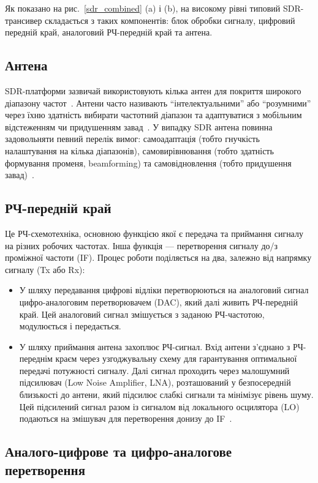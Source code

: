 \documentclass[journal]{IEEEtran}
\begin{document}
\label{arch}
Як показано на рис.~\ref{sdr_combined} (a) і (b), на високому рівні типовий SDR-трансивер складається з таких компонентів: блок обробки сигналу, цифровий передній край, аналоговий РЧ-передній край та антена.

\subsection{Антена}
SDR-платформи зазвичай використовують кілька антен для покриття широкого діапазону частот~\cite{rohde2017}.
Антени часто називають ``інтелектуальними'' або ``розумними'' через їхню здатність вибирати частотний діапазон та адаптуватися з мобільним відстеженням чи придушенням завад~\cite{Rouphael2009,Haghighat2002a}.
У випадку SDR антена повинна задовольняти певний перелік вимог: самоадаптація (тобто гнучкість налаштування на кілька діапазонів), самовирівнювання (тобто здатність формування променя, beamforming) та самовідновлення (тобто придушення завад)~\cite{Rouphael2009}.

\subsection{РЧ-передній край}
Це РЧ-схемотехніка, основною функцією якої є передача та приймання сигналу на різних робочих частотах.
Інша функція — перетворення сигналу до/з проміжної частоти (IF).
Процес роботи поділяється на два, залежно від напрямку сигналу (Tx або Rx):
\begin{itemize}
\item У шляху передавання цифрові відліки перетворюються на аналоговий сигнал цифро-аналоговим перетворювачем (DAC), який далі живить РЧ-передній край.
Цей аналоговий сигнал змішується з заданою РЧ-частотою, модулюється і передається.
\item У шляху приймання антена захоплює РЧ-сигнал.
Вхід антени з'єднано з РЧ-переднім краєм через узгоджувальну схему для гарантування оптимальної передачі потужності сигналу.
Далі сигнал проходить через малошумний підсилювач (Low Noise Amplifier, LNA), розташований у безпосередній близькості до антени, який підсилює слабкі сигнали та мінімізує рівень шуму.
Цей підсилений сигнал разом із сигналом від локального осцилятора (LO) подаються на змішувач для перетворення донизу до IF~\cite{Carr2001}.
\end{itemize}

\subsection{Аналого-цифрове та цифро-аналогове перетворення}
\end{document}
